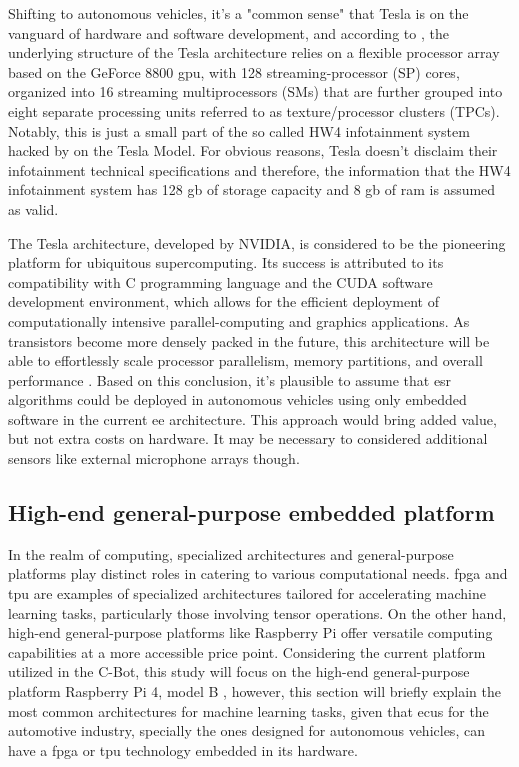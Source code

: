
Shifting to autonomous vehicles, it's a "common sense" that Tesla is on the vanguard of hardware and software development, and according to \textcite{Lindholm2008}, the underlying structure of the Tesla architecture relies on a flexible processor array based on the GeForce 8800 \gls{gpu}, with 128 streaming-processor (SP) cores, organized into 16 streaming multiprocessors (SMs) that are further grouped into eight separate processing units referred to as texture/processor clusters (TPCs). Notably, this is just a small part of the so called HW4 infotainment system hacked by \textcite{Teslanorth2023} on the Tesla Model. For obvious reasons, Tesla doesn't disclaim their infotainment technical specifications and therefore, the information that the HW4 infotainment system has 128 \gls{g}\gls{b} of storage capacity and 8 \gls{g}\gls{b} of \gls{ram} is assumed as valid.

The Tesla architecture, developed by NVIDIA, is considered to be the pioneering platform for ubiquitous supercomputing. Its success is attributed to its compatibility with C programming language and the CUDA software development environment, which allows for the efficient deployment of computationally intensive parallel-computing and graphics applications. As transistors become more densely packed in the future, this architecture will be able to effortlessly scale processor parallelism, memory partitions, and overall performance \cite{Lindholm2008}. Based on this conclusion, it's plausible to assume that \gls{esr} algorithms could be deployed in autonomous vehicles using only embedded software in the current \gls{ee} architecture. This approach would bring added value, but not extra costs on hardware. It may be necessary to considered additional sensors like external microphone arrays though.


\subsection{High-end general-purpose embedded platform}
\label{subsec:ECU_high-end-platform}

In the realm of computing, specialized architectures and general-purpose platforms play distinct roles in catering to various computational needs. \gls{fpga} and \gls{tpu} are examples of specialized architectures tailored for accelerating machine learning tasks, particularly those involving tensor operations. On the other hand, high-end general-purpose platforms like Raspberry Pi offer versatile computing capabilities at a more accessible price point. Considering the current platform utilized in the C-Bot, this study will focus on the high-end general-purpose platform Raspberry Pi 4, model B \cite{Raspberry2023}, however, this section will briefly explain the most common architectures for machine learning tasks, given that \gls{ecu}s for the automotive industry, specially the ones designed for autonomous vehicles, can have a \gls{fpga} or \gls{tpu} technology embedded in its hardware.

